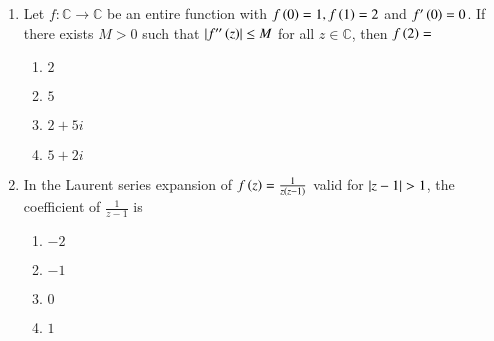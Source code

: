 \documentclass[journal]{IEEEtran}
\begin{document}
\begin{enumerate}
    \item Let $f : \mathbb{C} \rightarrow \mathbb{C}$ be an entire function with $f\left(0\right) = 1, f\left(1\right) = 2 $ and $f^{\prime} \left(0\right) = 0$. If there exists $M > 0$ such that $\left\vert f^{\prime \prime} \left(z\right)\right\vert \leq M$ for all $z \in \mathbb{C}$, then $f\left(2\right) = $
        \begin{enumerate}
            \item $2$
            \item $5$
            \item $2+5i$
            \item $5 + 2 i$
        \end{enumerate}

    \item In the Laurent series expansion of $f\left(z\right) =  \frac{1}{z\left(z-1\right)}$ valid for $\left\vert z-1\right\vert > 1$, the coefficient of $\frac{1}{z-1}$ is
        \begin{enumerate}
            \item $-2$
            \item $-1$
            \item $0$
            \item $1$
        \end{enumerate}
\end{enumerate}


  
\end{document}
